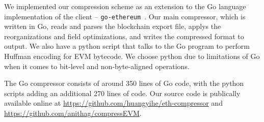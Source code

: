 We implemented our compression scheme as an extension to the Go language implementation of the \eth{} client -- \texttt{go-ethereum}~\cite{go-eth}.
Our main compressor, which is written in Go, reads and parses the blockchain export file,
applys the reorganizations and field optimizations, and writes the compressed format to output.
We also have a python script that talks to the Go program to perform Huffman encoding for EVM bytecode.
We choose python due to limitations of Go when it comes to bit-level and non-byte-aligned operations.

The Go compressor consists of around 350 lines of Go code,
with the python scripts adding an additional 270 lines of code.
Our source code is publically available online at
\url{https://github.com/huangyihe/eth-compressor}
and
\url{https://github.com/anithag/compressEVM}.
